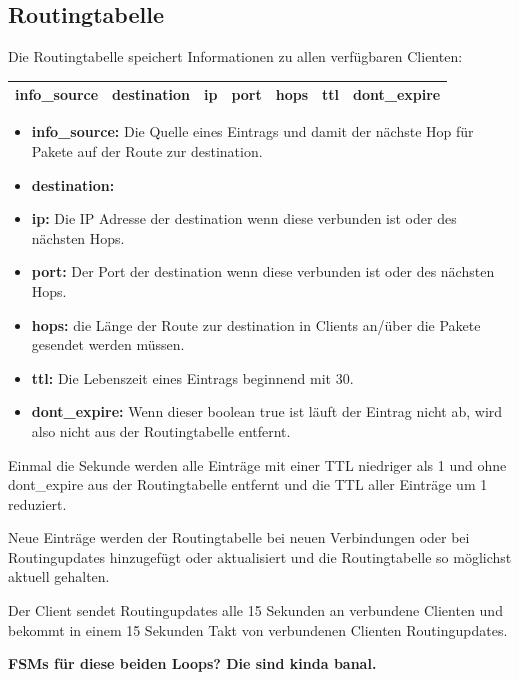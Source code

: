 \subsection{Routingtabelle}
Die Routingtabelle speichert Informationen zu allen verfügbaren Clienten:
\\
\begin{center}
\begin{tabular}{|c|c|c|c|c|c|c|}
\hline
info\_source & destination & ip & port & hops & ttl & dont\_expire
\\ \hline
\end{tabular}
\end{center}
\begin{itemize}
    \item \textbf{info\_source:} Die Quelle eines Eintrags und damit der nächste Hop für Pakete auf der Route zur destination.
    \item \textbf{destination:} 
    \item \textbf{ip:} Die IP Adresse der destination wenn diese verbunden ist oder des nächsten Hops.  
    \item \textbf{port:} Der Port der destination wenn diese verbunden ist oder des nächsten Hops.
    \item \textbf{hops:} die Länge der Route zur destination in Clients an/über die Pakete gesendet werden müssen.
    \item \textbf{ttl:} Die Lebenszeit eines Eintrags beginnend mit 30. 
    \item \textbf{dont\_expire:} Wenn dieser boolean true ist läuft der Eintrag nicht ab, wird also nicht aus der Routingtabelle entfernt.
\end{itemize}
Einmal die Sekunde werden alle Einträge mit einer TTL niedriger als 1 und ohne dont\_expire aus der Routingtabelle entfernt und die TTL aller Einträge um 1 reduziert.

\noindent Neue Einträge werden der Routingtabelle bei neuen Verbindungen oder bei Routingupdates hinzugefügt oder aktualisiert und die Routingtabelle so möglichst aktuell gehalten.

\noindent Der Client sendet Routingupdates alle 15 Sekunden an verbundene Clienten und bekommt in einem 15 Sekunden Takt von verbundenen Clienten Routingupdates.

\textbf{FSMs für diese beiden Loops? Die sind kinda banal.}